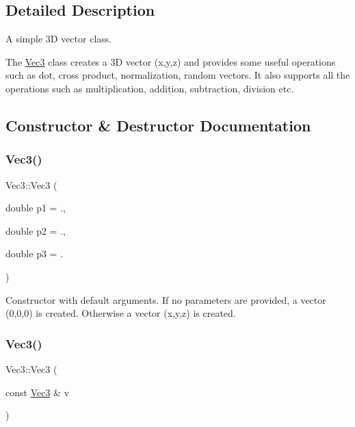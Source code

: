 \subsection{Detailed Description}
A simple 3D vector class. 

The \mbox{\hyperlink{classVec3}{Vec3}} class creates a 3D vector (x,y,z) and provides some useful operations such as dot, cross product, normalization, random vectors. It also supports all the operations such as multiplication, addition, subtraction, division etc. 

\subsection{Constructor \& Destructor Documentation}
\mbox{\label{classVec3_a592864fbd499222e456c7615a89cc3b4}} 
\subsubsection{\texorpdfstring{Vec3()}{Vec3()}\hspace{0.1cm}{\footnotesize\ttfamily [1/2]}}
{\footnotesize\ttfamily Vec3\+::\+Vec3 (\begin{DoxyParamCaption}\item[{double}]{p1 = {.},  }\item[{double}]{p2 = {.},  }\item[{double}]{p3 = {.} }\end{DoxyParamCaption})\hspace{0.3cm}{\ttfamily [inline]}}

Constructor with default arguments. If no parameters are provided, a vector (0,0,0) is created. Otherwise a vector (x,y,z) is created. \mbox{\label{classVec3_a2ca080e91b77109c23ba5c387a2c1ddb}} 
\subsubsection{\texorpdfstring{Vec3()}{Vec3()}\hspace{0.1cm}{\footnotesize\ttfamily [2/2]}}
{\footnotesize\ttfamily Vec3\+::\+Vec3 (\begin{DoxyParamCaption}\item[{const \mbox{\hyperlink{classVec3}{Vec3}} \&}]{v }\end{DoxyParamCaption})\hspace{0.3cm}{\ttfamily [inline]}}

